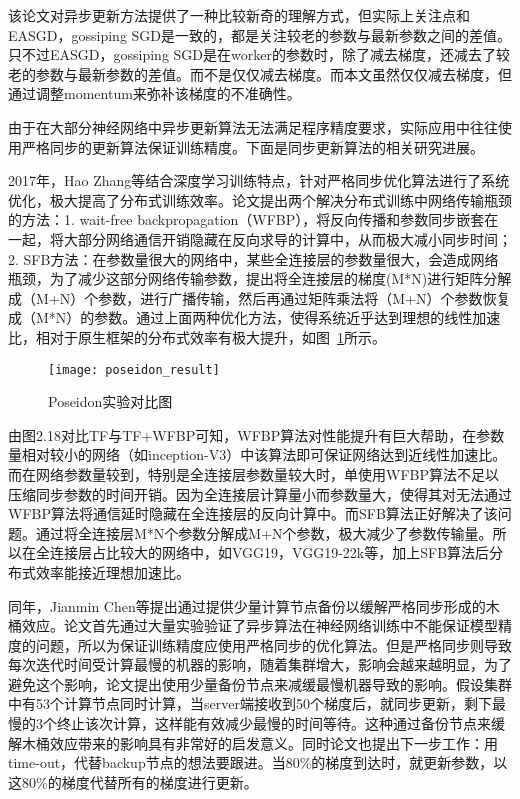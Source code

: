 该论文对异步更新方法提供了一种比较新奇的理解方式，但实际上关注点和EASGD，gossiping SGD是一致的，都是关注较老的参数与最新参数之间的差值。只不过EASGD，gossiping SGD是在worker的参数时，除了减去梯度，还减去了较老的参数与最新参数的差值。而不是仅仅减去梯度。而本文虽然仅仅减去梯度，但通过调整momentum来弥补该梯度的不准确性。

由于在大部分神经网络中异步更新算法无法满足程序精度要求，实际应用中往往使用严格同步的更新算法保证训练精度。下面是同步更新算法的相关研究进展。

2017年，Hao Zhang等结合深度学习训练特点，针对严格同步优化算法进行了系统优化，极大提高了分布式训练效率。论文提出两个解决分布式训练中网络传输瓶颈的方法：1. wait-free backpropagation（WFBP），将反向传播和参数同步嵌套在一起，将大部分网络通信开销隐藏在反向求导的计算中，从而极大减小同步时间；2. SFB方法：在参数量很大的网络中，某些全连接层的参数量很大，会造成网络瓶颈，为了减少这部分网络传输参数，提出将全连接层的梯度(M*N)进行矩阵分解成（M+N）个参数，进行广播传输，然后再通过矩阵乘法将（M+N）个参数恢复成（M*N）的参数。通过上面两种优化方法，使得系统近乎达到理想的线性加速比，相对于原生框架的分布式效率有极大提升，如图~\ref{fig:poseidon_result}所示。

\begin{figure}[htp]
\centering
\texttt{[image: poseidon\_result]}
\caption{Poseidon实验对比图}
\label{fig:poseidon_result}
\end{figure}
由图2.18对比TF与TF+WFBP可知，WFBP算法对性能提升有巨大帮助，在参数量相对较小的网络（如inception-V3）中该算法即可保证网络达到近线性加速比。而在网络参数量较到，特别是全连接层参数量较大时，单使用WFBP算法不足以压缩同步参数的时间开销。因为全连接层计算量小而参数量大，使得其对无法通过WFBP算法将通信延时隐藏在全连接层的反向计算中。而SFB算法正好解决了该问题。通过将全连接层M*N个参数分解成M+N个参数，极大减少了参数传输量。所以在全连接层占比较大的网络中，如VGG19，VGG19-22k等，加上SFB算法后分布式效率能接近理想加速比。

同年，Jianmin Chen等提出通过提供少量计算节点备份以缓解严格同步形成的木桶效应。论文首先通过大量实验验证了异步算法在神经网络训练中不能保证模型精度的问题，所以为保证训练精度应使用严格同步的优化算法。但是严格同步则导致每次迭代时间受计算最慢的机器的影响，随着集群增大，影响会越来越明显，为了避免这个影响，论文提出使用少量备份节点来减缓最慢机器导致的影响。假设集群中有53个计算节点同时计算，当server端接收到50个梯度后，就同步更新，剩下最慢的3个终止该次计算，这样能有效减少最慢的时间等待。这种通过备份节点来缓解木桶效应带来的影响具有非常好的启发意义。同时论文也提出下一步工作：用time-out，代替backup节点的想法要跟进。当80\%的梯度到达时，就更新参数，以这80\%的梯度代替所有的梯度进行更新。

